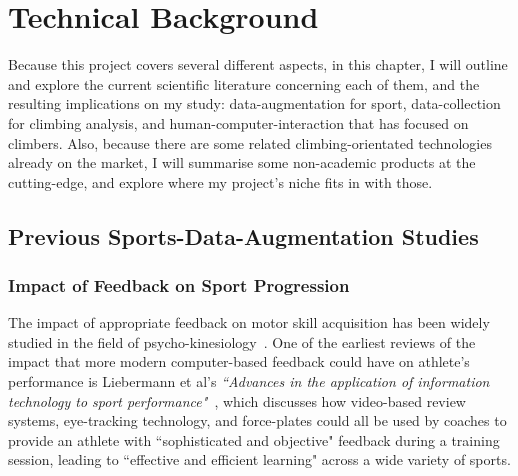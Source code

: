 \chapter{Technical Background}
\label{chap:technical}





\noindent
Because this project covers several different aspects, in this chapter, I will outline and explore the current scientific literature concerning each of them, and the resulting implications on my study: data-augmentation for sport, data-collection for climbing analysis, and human-computer-interaction that has focused on climbers.
Also, because there are some related climbing-orientated technologies already on the market, I will summarise some non-academic products at the cutting-edge, and explore where my project's niche fits in with those.


\section{Previous Sports-Data-Augmentation Studies}
\subsection{Impact of Feedback on Sport Progression}
The impact of appropriate feedback on motor skill acquisition has been widely studied in the field of psycho-kinesiology~\cite{schmidt75aschema, schmidt2005motor}.
One of the earliest reviews of the impact that more modern computer-based feedback could have on athlete's performance is Liebermann et al's \textit{``Advances in the application of information technology
to sport performance"}~\cite{lieberreview}, which discusses how video-based review systems, eye-tracking technology, and force-plates could all be used by coaches to provide an athlete with ``sophisticated and objective" feedback during a training session, leading to ``effective and efficient learning" across a wide variety of sports.

